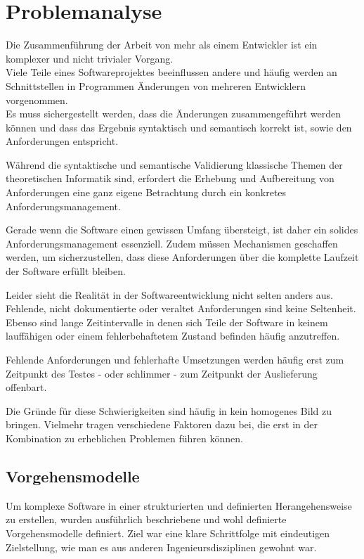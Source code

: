 \chapter{Problemanalyse}

Die Zusammenführung der Arbeit von mehr als einem Entwickler ist ein komplexer und nicht trivialer Vorgang. \\
Viele Teile eines Softwareprojektes beeinflussen andere und häufig werden an Schnittstellen in Programmen Änderungen von mehreren Entwicklern vorgenommen. \\
Es muss sichergestellt werden, dass die Änderungen zusammengeführt werden können und dass das Ergebnis syntaktisch und semantisch korrekt ist, sowie den Anforderungen entspricht.

Während die syntaktische und semantische Validierung klassische Themen der theoretischen Informatik sind, erfordert die Erhebung und Aufbereitung von Anforderungen eine ganz eigene Betrachtung durch ein konkretes Anforderungsmanagement.

Gerade wenn die Software einen gewissen Umfang übersteigt, ist daher ein solides Anforderungsmanagement essenziell. Zudem müssen Mechanismen geschaffen werden, um sicherzustellen, dass diese Anforderungen über die komplette Laufzeit der Software erfüllt bleiben. 

Leider sieht die Realität in der Softwareentwicklung nicht selten anders aus. Fehlende, nicht dokumentierte oder veraltet Anforderungen sind keine Seltenheit.\\
Ebenso sind lange Zeitintervalle in denen sich Teile der Software in keinem lauffähigen oder einem fehlerbehaftetem Zustand befinden häufig anzutreffen.

Fehlende Anforderungen und fehlerhafte Umsetzungen werden häufig erst zum Zeitpunkt des Testes - oder schlimmer - zum Zeitpunkt der Auslieferung offenbart.

Die Gründe für diese Schwierigkeiten sind häufig in kein homogenes Bild zu bringen. Vielmehr tragen verschiedene Faktoren dazu bei, die erst in der Kombination zu erheblichen Problemen führen können.

\section{Vorgehensmodelle}

Um komplexe Software in einer strukturierten und definierten Herangehensweise zu erstellen, wurden ausführlich beschriebene und wohl definierte Vorgehensmodelle definiert. Ziel war eine klare Schrittfolge mit eindeutigen Zielstellung, wie man es aus anderen Ingenieursdisziplinen gewohnt war. 

